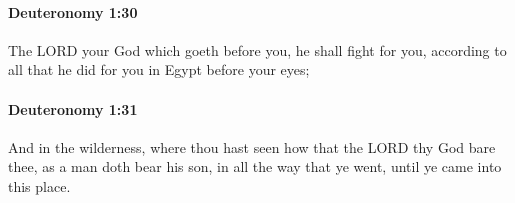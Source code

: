 		\paragraph{Deuteronomy 1:30} %
			\label{DEUTERONOMY-1-30}

			The LORD your God which goeth before you, he shall fight for you, according to all that he did for you in Egypt before your eyes;


		\paragraph{Deuteronomy 1:31} %
			\label{DEUTERONOMY-1-31}

			And in the wilderness, where thou hast seen how that the LORD thy God bare thee, as a man doth bear his son, in all the way that ye went, until ye came into this place.


